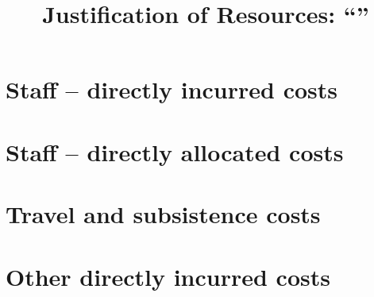 \documentclass[
squeezespace=false,
showframe=false,
a4paper,
fontsize=11pt]{scrartcl}
\title{Justification of Resources: ``''}
\begin{document}
\maketitle{}

\section{Staff -- directly incurred costs}

\section{Staff -- directly allocated costs}

\section{Travel and subsistence costs}

\section{Other directly incurred costs}
\end{document}
